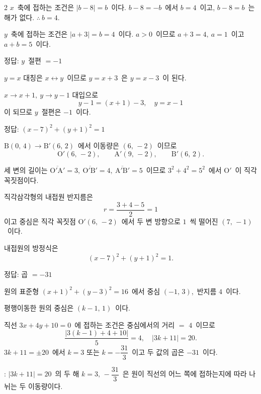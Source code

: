 \documentclass[10pt,fleqn]{article}
\begin{document}
\begin{multicols*}{2}
$x$\ 축에 접하는 조건은 $|b - 8| = b$\ 이다. $b - 8 = -b$\ 에서 $b = 4$\ 이고, $b - 8 = b$\ 는 해가 없다. $\therefore\ b = 4$.

$y$\ 축에 접하는 조건은 $|a + 3| = b = 4$\ 이다. $a > 0$\ 이므로 $a + 3 = 4,\ a = 1$\ 이고 $a + b = 5$\ 이다.
\begin{dmanswerbox}
정답: $y$\ 절편 $=-1$
\end{dmanswerbox}

$y = x$ 대칭은 $x \leftrightarrow y$\ 이므로 $y = x + 3$\ 은 $y = x - 3$\ 이 된다.

$x \to x + 1,\ y \to y - 1$ 대입으로
\[ y - 1 = (x + 1) - 3,\quad y = x - 1 \]
이 되므로 $y$\ 절편은 $-1$\ 이다.
\begin{dmanswerbox}
정답: $(x-7)^2+(y+1)^2=1$
\end{dmanswerbox}

$\mathrm{B}(0,\, 4) \to \mathrm{B}'(6,\, 2)$\ 에서 이동량은 $(6,\, -2)$\ 이므로
\[ \mathrm{O}'(6,\, -2),\qquad \mathrm{A}'(9,\, -2),\qquad \mathrm{B}'(6,\, 2). \]

세 변의 길이는 $\overline{\mathrm{O}'\mathrm{A}'} = 3,\ \overline{\mathrm{O}'\mathrm{B}'} = 4,\ \overline{\mathrm{A}'\mathrm{B}'} = 5$\ 이므로 $3^2 + 4^2 = 5^2$\ 에서 $\mathrm{O}'$\ 이 직각 꼭짓점이다.

직각삼각형의 내접원 반지름은
\[ r = \dfrac{3 + 4 - 5}{2} = 1 \]
이고 중심은 직각 꼭짓점 $\mathrm{O}'(6,\, -2)$\ 에서 두 변 방향으로 $1$\ 씩 떨어진 $(7,\, -1)$\ 이다.

내접원의 방정식은
\[ (x - 7)^2 + (y + 1)^2 = 1. \]

\begin{dmanswerbox}
정답: 곱 $=-31$
\end{dmanswerbox}

원의 표준형 $(x + 1)^2 + (y - 3)^2 = 16$\ 에서 중심 $(-1,\, 3)$,\ 반지름 $4$\ 이다.

평행이동한 원의 중심은 $(k - 1,\, 1)$\ 이다.

직선 $3x + 4y + 10 = 0$\ 에 접하는 조건은 중심에서의 거리 $=$ $4$\ 이므로
\[ \dfrac{|3(k - 1) + 4 + 10|}{5} = 4,\quad |3k + 11| = 20. \]
$3k + 11 = \pm 20$\ 에서 $k = 3$ 또는 $k = -\dfrac{31}{3}$\ 이고 두 값의 곱은 $-31$\ 이다.

\begin{dmcriticalpoint}
: $|3k+11|=20$\ 의 두 해 $k=3,\, -\dfrac{31}{3}$\ 은 원이 직선의 어느 쪽에 접하는지에 따라 나뉘는 두 이동량이다.
\end{dmcriticalpoint}


\end{multicols*}
\end{document}
